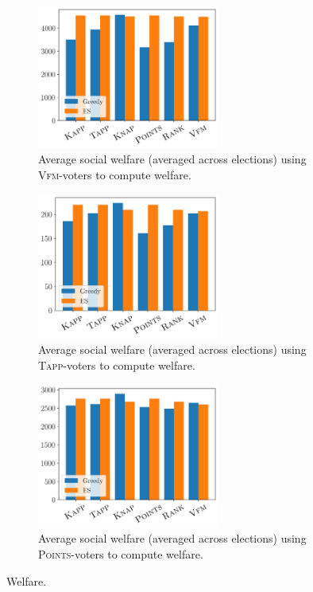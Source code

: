 \documentclass{comsoc2023}
\newcommand{\points}{\textsc{Points}}
\newcommand{\vfm}{\textsc{Vfm}}
\newcommand{\tapp}{\textsc{Tapp}}
\begin{document}
\begin{figure}[ht]
     \hfill
     \begin{subfigure}[b]{0.45\textwidth}
         \centering
\includegraphics[width=6cm]{experiment/Ranking_value_money_welfare.png}
\caption{Average social welfare (averaged across elections) using \vfm{}-voters to compute welfare.
}\label{fig:vfm_welfare}
     \end{subfigure}
     \begin{subfigure}[b]{0.45\textwidth}
         \centering
\includegraphics[width=6cm]{experiment/Threshold_welfare.png}
\caption{Average social welfare (averaged across elections) using \tapp{}-voters to compute welfare.
}\label{fig:tapp_welfare}
     \end{subfigure}
     \hfill
     \begin{subfigure}[b]{0.45\textwidth}
         \centering
\includegraphics[width=6cm]{experiment/Utilities_welfare.png}
\caption{Average social welfare (averaged across elections) using \points{}-voters to compute welfare.
}\label{fig:util_welfare}
     \end{subfigure}
     

        \caption{Welfare.}
        \label{fig:entropy:app}
\end{figure}

\end{document}
